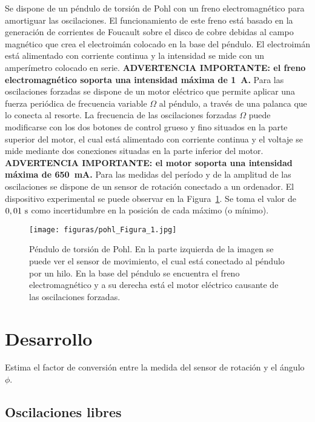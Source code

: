 \documentclass[11pt]{articulo}
\begin{document}
Se dispone de un p\'endulo de torsi\'on de Pohl con un freno electromagn\'etico para amortiguar las oscilaciones. El funcionamiento de este freno est\'a basado en la generaci\'on de corrientes de Foucault sobre el disco de cobre debidas al campo magn\'etico que crea el electroim\'an colocado en la base del p\'endulo. El electroim\'an est\'a alimentado con corriente continua y la intensidad se mide con un amper\'imetro colocado en serie. {\bf ADVERTENCIA IMPORTANTE: el freno electromagn\'etico soporta una intensidad m\'axima de 1~A.} Para las oscilaciones forzadas se dispone de un motor el\'ectrico que permite aplicar una fuerza peri\'odica de frecuencia variable $\Omega$ al p\'endulo, a trav\'es de una palanca que lo conecta al resorte. La frecuencia de las oscilaciones forzadas $\Omega$ puede modificarse con los dos botones de control grueso y fino situados en la parte superior del motor, el cual est\'a alimentado con corriente continua y el voltaje se mide mediante dos conexiones situadas en la parte inferior del motor. {\bf ADVERTENCIA IMPORTANTE: el motor soporta una intensidad m\'axima de 650~mA.} Para las medidas del per\'iodo y de la amplitud de las oscilaciones se dispone de un sensor de rotaci\'on conectado a un ordenador. El dispositivo experimental se puede observar en la Figura~\ref{pohl}. Se toma el valor de $0,01~{\rm s}$ como incertidumbre en la posici\'on de cada m\'aximo (o m\'inimo).
%
\begin{figure}[htb]
\begin{center}
\hspace*{0.0cm}
\texttt{[image: figuras/pohl\_Figura\_1.jpg]}
\end{center}
\vspace*{-0.6cm}
\caption[]{\label{pohl}{P\'endulo de torsi\'on de Pohl. En la parte izquierda de la imagen se puede ver el sensor de movimiento, el cual est\'a conectado al p\'endulo por un hilo. En la base del p\'endulo se encuentra el freno electromagn\'etico y a su derecha est\'a el motor el\'ectrico causante de las oscilaciones forzadas.}}
\end{figure}


\section{Desarrollo}

Estima el factor de conversi\'on entre la medida del sensor de rotaci\'on y el \'angulo $\phi$.

\subsection{Oscilaciones libres}
\end{document}
